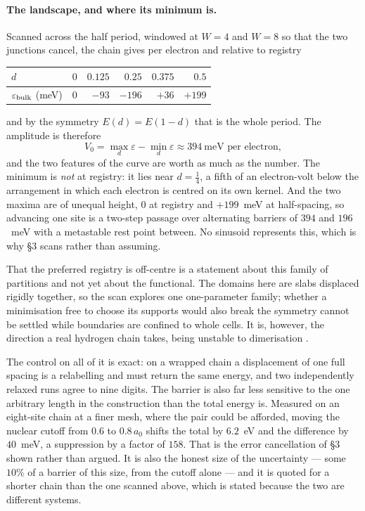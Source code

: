 \documentclass[11pt]{article}
\begin{document}
\paragraph{The landscape, and where its minimum is.} Scanned across the half period, windowed at
$W=4$ and $W=8$ so that the two junctions cancel, the chain gives per electron and relative to
registry
\begin{center}
\small
\begin{tabular}{@{}lrrrrr@{}}
\toprule
$d$ & $0$ & $0.125$ & $0.25$ & $0.375$ & $0.5$\\
\midrule
$\varepsilon_{\rm bulk}$ (meV) & $0$ & $-93$ & $-196$ & $+36$ & $+199$\\
\bottomrule
\end{tabular}
\end{center}
\noindent and by the symmetry $E(d)=E(1-d)$ that is the whole period. The amplitude is therefore
\[
V_0 = \max_d\varepsilon - \min_d\varepsilon \approx 394~\text{meV per electron},
\]
and the two features of the curve are worth as much as the number. The minimum is \emph{not} at
registry: it lies near $d=\tfrac14$, a fifth of an electron-volt below the arrangement in which each
electron is centred on its own kernel. And the two maxima are of unequal height, $0$ at registry and
$+199$~meV at half-spacing, so advancing one site is a two-step passage over alternating barriers of
$394$ and $196$~meV with a metastable rest point between. No sinusoid represents this, which is why
\S3 scans rather than assuming.

That the preferred registry is off-centre is a statement about this family of partitions and not yet
about the functional. The domains here are slabs displaced rigidly together, so the scan explores one
one-parameter family; whether a minimisation free to choose its supports would also break the
symmetry cannot be settled while boundaries are confined to whole cells. It is, however, the
direction a real hydrogen chain takes, being unstable to dimerisation \cite{simons20}.

The control on all of it is exact: on a wrapped chain a displacement of one full spacing is a
relabelling and must return the same energy, and two independently relaxed runs agree to nine digits.
The barrier is also far less sensitive to the one arbitrary length in the construction than the
total energy is. Measured on an eight-site chain at a finer mesh, where the pair could be afforded,
moving the nuclear cutoff from $0.6$ to $0.8\,a_0$ shifts the total by $6.2$~eV and the difference
by $40$~meV, a suppression by a factor of $158$. That is the error cancellation of \S3 shown rather
than argued. It is also the honest size of the uncertainty --- some $10\%$ of a barrier of this
size, from the cutoff alone --- and it is quoted for a shorter chain than the one scanned above,
which is stated because the two are different systems.
\end{document}
